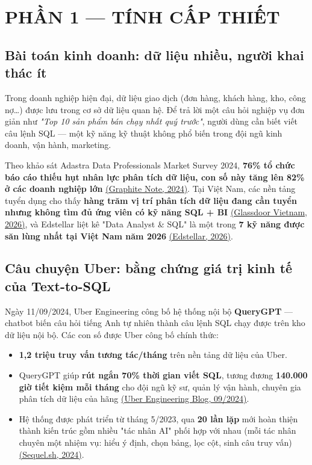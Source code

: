 \documentclass[11pt,a4paper]{article}
\begin{document}
\newpage
\section{PHẦN 1 --- TÍNH CẤP THIẾT}

\subsection{Bài toán kinh doanh: dữ liệu nhiều, người khai thác ít}

Trong doanh nghiệp hiện đại, dữ liệu giao dịch (đơn hàng, khách hàng, kho, công nợ\ldots) được lưu trong cơ sở dữ liệu quan hệ. Để trả lời một câu hỏi nghiệp vụ đơn giản như \textit{"Top 10 sản phẩm bán chạy nhất quý trước"}, người dùng cần biết viết câu lệnh SQL --- một kỹ năng kỹ thuật không phổ biến trong đội ngũ kinh doanh, vận hành, marketing.

Theo khảo sát Adastra Data Professionals Market Survey 2024, \textbf{76\% tổ chức báo cáo thiếu hụt nhân lực phân tích dữ liệu, con số này tăng lên 82\% ở các doanh nghiệp lớn} \href{https://graphite-note.com/data-scientist-shortage/}{(Graphite Note, 2024)}. Tại Việt Nam, các nền tảng tuyển dụng cho thấy \textbf{hàng trăm vị trí phân tích dữ liệu đang cần tuyển nhưng không tìm đủ ứng viên có kỹ năng SQL + BI} \href{https://www.glassdoor.com/Job/vietnam-data-analyst-jobs-SRCH_IL.0,7_IN251_KO8,20.htm}{(Glassdoor Vietnam, 2026)}, và Edstellar liệt kê "Data Analyst \& SQL" là một trong \textbf{7 kỹ năng được săn lùng nhất tại Việt Nam năm 2026} \href{https://www.edstellar.com/blog/skills-in-demand-in-vietnam}{(Edstellar, 2026)}.

\subsection{Câu chuyện Uber: bằng chứng giá trị kinh tế của Text-to-SQL}

Ngày 11/09/2024, Uber Engineering công bố hệ thống nội bộ \textbf{QueryGPT} --- chatbot biến câu hỏi tiếng Anh tự nhiên thành câu lệnh SQL chạy được trên kho dữ liệu nội bộ. Các con số được Uber công bố chính thức:

\begin{itemize}
\item \textbf{1,2 triệu truy vấn tương tác/tháng} trên nền tảng dữ liệu của Uber.
\item QueryGPT giúp \textbf{rút ngắn 70\% thời gian viết SQL}, tương đương \textbf{140.000 giờ tiết kiệm mỗi tháng} cho đội ngũ kỹ sư, quản lý vận hành, chuyên gia phân tích dữ liệu của hãng \href{https://www.uber.com/us/en/blog/query-gpt/}{(Uber Engineering Blog, 09/2024)}.
\item Hệ thống được phát triển từ tháng 5/2023, qua \textbf{20 lần lặp} mới hoàn thiện thành kiến trúc gồm nhiều "tác nhân AI" phối hợp với nhau (mỗi tác nhân chuyên một nhiệm vụ: hiểu ý định, chọn bảng, lọc cột, sinh câu truy vấn) \href{https://sequel.sh/blog/query-gpt-uber}{(Sequel.sh, 2024)}.
\end{itemize}
\end{document}
